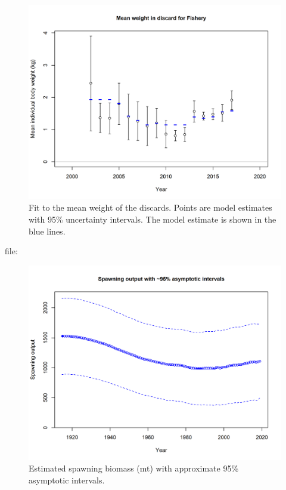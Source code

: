\documentclass[12pt,]{article}
\begin{document}
\begin{figure}
\centering
\includegraphics{r4ss/plots_mod1/bodywt_fit_fltFishery.png}
\caption{Fit to the mean weight of the discards. Points are model
estimates with 95\% uncertainty intervals. The model estimate is shown
in the blue lines.\label{fig:bodywt_fit_fltFishery}}
\end{figure}

file:

\FloatBarrier

\begin{figure}
\centering
\includegraphics{r4ss/plots_mod1/ts7_Spawning_output_with_95_asymptotic_intervals_intervals.png}
\caption{Estimated spawning biomass (mt) with approximate 95\%
asymptotic intervals.
\label{fig:ts7_Spawning_biomass_(mt)_with_95_asymptotic_intervals_intervals}}
\end{figure}
\end{document}
